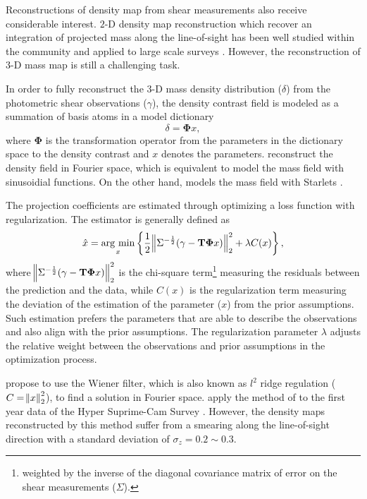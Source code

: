 \documentclass[twocolumn]{aastex62}
\newcommand{\argmin}{\mathop{\rm arg~min}\limits}
\begin{document}
Reconstructions of density map from shear measurements also receive considerable interest. $2$-D density map reconstruction 
which recover an integration of projected mass along the line-of-sight has been well studied within the community
\citep{massMap-KS1993,WL-massMap-Glimpse2D-Lanusse2016,sparseBaysianMassMap-Price2020}
and applied to large scale surveys \citep{HSC1-massMaps,massMapDES-Chang2018,DES-SV-massMap-sparsity}. However, the 
reconstruction of $3$-D mass map is still a challenging task.

In order to fully reconstruct the $3$-D mass density distribution ($\delta$) from the photometric shear observations ($\gamma$),
the density contrast field is modeled as a summation of basis atoms in a model dictionary
\begin{equation} \label{eq-intro-dict}
 \delta= \mathbf{\Phi} x,
\end{equation}
where $\mathbf{\Phi}$ is the transformation operator from the parameters in the dictionary space to the density contrast 
and $x$ denotes the parameters. \citet{LSS-massMap-Wiener-Simon2009} reconstruct the density field
in Fourier space, which is equivalent to model the mass field with sinusoidial functions. On the other hand,
\citet{LSS-massMap-Glimpse3D-Leonard2014} models the mass field with Starlets \citep{Starlet-Starck2015}.

The projection coefficients are estimated through optimizing a loss function with regularization. The estimator is
generally defined as
\begin{equation}
\hat{x}=\argmin_{x} \left\{ \frac{1}{2}\norm{\Sigma^{-\frac{1}{2}}(\gamma- \mathbf{T\Phi} x)}_2^2+ \lambda C(x) \right\},
\end{equation}
where $\norm{\Sigma^{-\frac{1}{2}}(\gamma - \mathbf{T\Phi} x)}_2^2$ is the chi-square term\footnote{weighted by the
inverse of the diagonal covariance matrix of error on the shear measurements ($\Sigma$).} measuring
the residuals between the prediction and the data, while $C(x)$ is the regularization term measuring the deviation of
the estimation of the parameter ($x$) from the prior assumptions. Such estimation prefers the parameters that are able
to describe the observations and also align with the prior assumptions. The regularization parameter $\lambda$ adjusts 
the relative weight between the observations and prior assumptions in the optimization process.

\citet{LSS-massMap-Wiener-Simon2009} propose to use the Wiener filter, which is also known as $l^2$ ridge regulation 
($C=\norm{x}^2_2$), to find a solution in Fourier space. \citet{HSC1-massMaps} apply the method of 
\citet{LSS-massMap-Wiener-Simon2009} to the first year data of the Hyper Suprime-Cam Survey \citep{HSC1-data}. 
However, the density maps reconstructed by this method suffer from a smearing along the line-of-sight direction with 
a standard deviation of $\sigma_z=0.2 \sim 0.3$.
\end{document}
